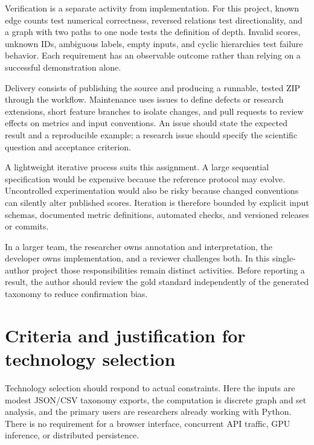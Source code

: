 \documentclass[12pt,a4paper]{article}
\begin{document}
Verification is a separate activity from implementation. For this project, known edge counts test numerical correctness, reversed relations test directionality, and a graph with two paths to one node tests the definition of depth. Invalid scores, unknown IDs, ambiguous labels, empty inputs, and cyclic hierarchies test failure behavior. Each requirement has an observable outcome rather than relying on a successful demonstration alone.

Delivery consists of publishing the source and producing a runnable, tested ZIP through the workflow. Maintenance uses issues to define defects or research extensions, short feature branches to isolate changes, and pull requests to review effects on metrics and input conventions. An issue should state the expected result and a reproducible example; a research issue should specify the scientific question and acceptance criterion.

A lightweight iterative process suits this assignment. A large sequential specification would be expensive because the reference protocol may evolve. Uncontrolled experimentation would also be risky because changed conventions can silently alter published scores. Iteration is therefore bounded by explicit input schemas, documented metric definitions, automated checks, and versioned releases or commits.

In a larger team, the researcher owns annotation and interpretation, the developer owns implementation, and a reviewer challenges both. In this single-author project those responsibilities remain distinct activities. Before reporting a result, the author should review the gold standard independently of the generated taxonomy to reduce confirmation bias.

\clearpage
\section{Criteria and justification for technology selection}
Technology selection should respond to actual constraints. Here the inputs are modest JSON/CSV taxonomy exports, the computation is discrete graph and set analysis, and the primary users are researchers already working with Python. There is no requirement for a browser interface, concurrent API traffic, GPU inference, or distributed persistence.
\end{document}
